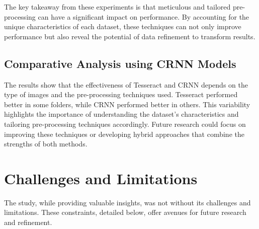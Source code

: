 The key takeaway from these experiments is that meticulous and tailored pre-processing can have a significant impact on performance. By accounting for the unique characteristics of each dataset, these techniques can not only improve performance but also reveal the potential of data refinement to transform results.

\subsection{Comparative Analysis using CRNN Models}

The results show that the effectiveness of Tesseract and CRNN depends on the type of images and the pre-processing techniques used. Tesseract performed better in some folders, while CRNN performed better in others. This variability highlights the importance of understanding the dataset's characteristics and tailoring pre-processing techniques accordingly. Future research could focus on improving these techniques or developing hybrid approaches that combine the strengths of both methods.

\newpage

\section{Challenges and Limitations}

The study, while providing valuable insights, was not without its challenges and limitations. These constraints, detailed below, offer avenues for future research and refinement.

